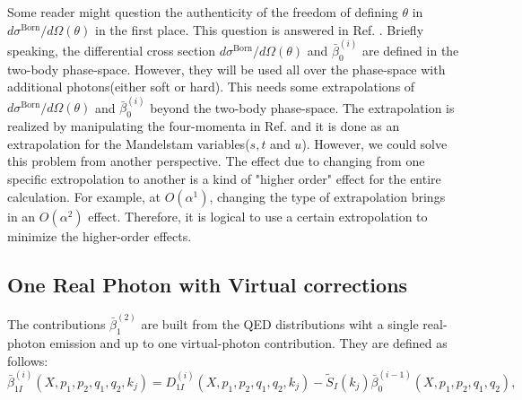 Some reader might question the authenticity of the freedom of defining $\theta$ in $d\sigma^\text{Born}/d\Omega(\theta)$ in the first place. This question is answered in Ref. \cite{BHLUMI2,YFS2}. Briefly speaking, the differential cross section $d\sigma^\text{Born}/d\Omega(\theta)$ and $\bar{\beta}_0^{(i)}$ are defined in the two-body phase-space. However, they will be used all over the phase-space with additional photons(either soft or hard). This needs some extrapolations of $d\sigma^\text{Born}/d\Omega(\theta)$ and $\bar{\beta}_0^{(i)}$ beyond the two-body phase-space. The extrapolation is realized by manipulating the four-momenta in Ref. \cite{YFS2} and it is done as an extrapolation for the Mandelstam variables($s,t$ and $u$). However, we could solve this problem from another perspective. The effect due to changing from one specific extropolation to another is a kind of "higher order" effect for the entire calculation. For example, at $O(\alpha^1)$, changing the type of extrapolation brings in an $O(\alpha^2)$ effect. Therefore, it is logical to use a certain extropolation to minimize the higher-order effects.  

\subsection{One Real Photon with Virtual corrections}
The contributions $\bar{\beta}_1^{(2)}$ are built from the QED distributions wiht a single real-photon emission and up to one virtual-photon contribution. They are defined as follows:
\begin{equation}
\bar{\beta}_{1I}^{(i)}(X,p_1,p_2,q_1,q_2,k_j)=D_{1I}^{(i)}(X,p_1,p_2,q_1,q_2,k_j)-\tilde{S}_I(k_j)\bar{\beta}_0^{(i-1)}(X,p_1,p_2,q_1,q_2),
\end{equation}

